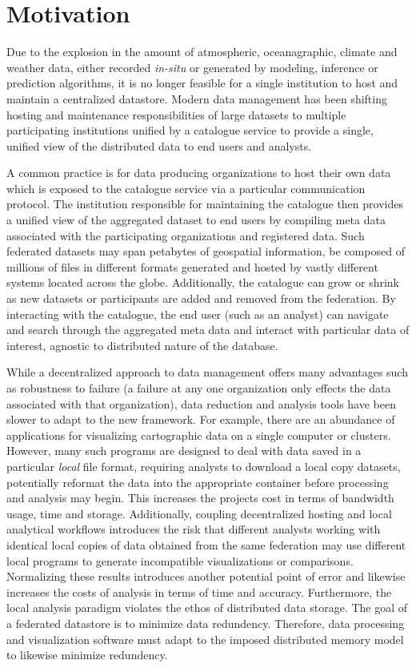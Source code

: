 \section{Motivation}
\label{sec:motivation}
Due to the explosion in the amount of atmospheric, oceanagraphic,
climate and weather data, either recorded \emph{in-situ} or generated
by modeling, inference or prediction algorithms, it is no longer
feasible for a single institution to host and maintain a centralized
datastore. Modern data management has been shifting hosting and
maintenance responsibilities of large datasets to multiple
participating institutions unified by a catalogue service to provide a
single, unified view of the distributed data to end users and analysts.

A common practice is for data producing organizations to host their
own data which is exposed to the catalogue service via a particular
communication protocol. The institution responsible for maintaining
the catalogue then provides a unified view of the aggregated dataset
to end users by compiling meta data associated with the participating
organizations and registered data. Such federated datasets may
span petabytes of geospatial information, be composed of millions of
files in different formats generated and hosted by vastly
different systems located across the globe. Additionally, the
catalogue can grow or shrink as new datasets or participants are added
and removed from the federation. By interacting with the catalogue,
the end user (such as an analyst) can navigate and search through the
aggregated meta data and interact with particular data of
interest, agnostic to distributed nature of the database.

While a decentralized approach to data management offers many
advantages such as robustness to failure (a failure at any one
organization only effects the data associated with that organization),
data reduction and analysis tools have been slower to adapt to the new
framework. For example, there are an abundance of applications for
visualizing cartographic data on a single computer or
clusters. However, many such programs are designed to deal with data
saved in a particular \textit{local} file format, requiring analysts
to download a local copy datasets, potentially reformat the data into
the appropriate container before processing and analysis may
begin. This increases the projects cost in terms of bandwidth usage,
time and storage. Additionally, coupling decentralized hosting and
local analytical workflows introduces the risk that different analysts
working with identical local copies of data obtained from the same
federation may use different local programs to generate incompatible
visualizations or comparisons. Normalizing these results introduces
another potential point of error and likewise increases the costs of
analysis in terms of time and accuracy. Furthermore, the local
analysis paradigm violates the ethos of distributed data storage. The
goal of a federated datastore is to minimize data
redundency. Therefore, data processing and visualization software must
adapt to the imposed distributed memory model to likewise minimize
redundency.

